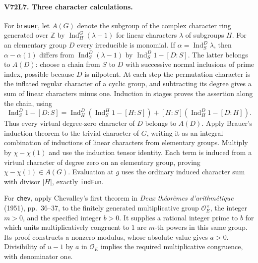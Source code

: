 \paragraph{V72L7. Three character calculations.}
For \texttt{brauer}, let $A(G)$ denote the subgroup of the complex
character ring generated over $\mathbb Z$ by
$\operatorname{Ind}_H^G(\lambda-1)$ for linear characters $\lambda$
of subgroups $H$. For an elementary group $D$ every irreducible is
monomial. If $\alpha=\operatorname{Ind}_S^D\lambda$, then
$\alpha-\alpha(1)$ differs from
$\operatorname{Ind}_S^D(\lambda-1)$ by
$\operatorname{Ind}_S^D1-[D:S]$. The latter belongs to $A(D)$:
choose a chain from $S$ to $D$ with successive normal inclusions of
prime index, possible because $D$ is nilpotent. At each step the
permutation character is the inflated regular character of a cyclic
group, and subtracting its degree gives a sum of linear characters
minus one. Induction in stages proves the assertion along the chain,
using
\[
 \operatorname{Ind}_S^D1-[D:S]
 =\operatorname{Ind}_H^D(\operatorname{Ind}_S^H1-[H:S])
   +[H:S](\operatorname{Ind}_H^D1-[D:H]).
\]
Thus every virtual degree-zero character of $D$ belongs to $A(D)$.
Apply Brauer's induction theorem to the trivial character of $G$,
writing it as an integral combination of inductions of linear
characters from elementary groups. Multiply by
$\chi-\chi(1)$ and use the induction tensor identity. Each term is
induced from a virtual character of degree zero on an elementary
group, proving $\chi-\chi(1)\in A(G)$. Evaluation at $g$ uses the
ordinary induced character sum with divisor $|H|$, exactly
\texttt{indFun}.

For \texttt{chev}, apply Chevalley's first theorem in
\emph{Deux théorèmes d'arithmétique} (1951), pp.~36--37, to the
finitely generated multiplicative group $\mathcal O_E^\times$,
the integer $m>0$, and the specified integer $b>0$. It supplies a
rational integer prime to $b$ for which units multiplicatively
congruent to $1$ are $m$-th powers in this same group. Its proof
constructs a nonzero modulus, whose absolute value gives $a>0$.
Divisibility of $u-1$ by $a$ in $\mathcal O_E$ implies the required
multiplicative congruence, with denominator one.

